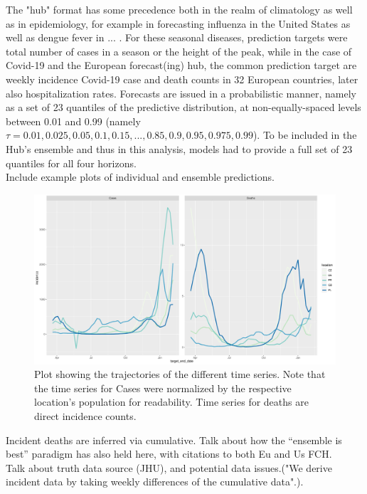 The "hub" format has some precedence both in the realm of climatology as well as in epidemiology, for example in forecasting influenza in the United States \cite{reich_collaborative_2019} as well as dengue fever in ... \cite{johansson_open_2019}. For these seasonal diseases, prediction targets were total number of cases in a season or the height of the peak, while in the case of Covid-19 and the European forecast(ing) hub, the common prediction target are weekly incidence Covid-19 case and death counts in 32  European countries, later also hospitalization rates. Forecasts are issued in a probabilistic manner, namely as a set of 23 quantiles of the predictive distribution, at non-equally-spaced levels between 0.01 and 0.99 (namely $\tau = 0.01, 0.025, 0.05, 0.1, 0.15, ..., 0.85, 0.9, 0.95, 0.975, 0.99$).
To be included in the Hub's ensemble and thus in this analysis, models had to provide a full set of 23 quantiles for all four horizons.\\
Include example plots of individual and ensemble predictions.\\
\begin{figure}
\includegraphics[width = \textwidth]{../plots/trajectories.pdf}
\caption{Plot showing the trajectories of the different time series. Note that the time series for Cases were normalized by the respective location's population for readability. Time series for deaths are direct incidence counts.}
\label{fig:trajectories}
\end{figure}
Incident deaths are inferred via cumulative.
Talk about how the ``ensemble is best'' paradigm has also held here, with citations to both Eu and Us FCH.\\
Talk about truth data source (JHU), and potential data issues.("We derive incident data by taking weekly differences of the cumulative data".).\\
